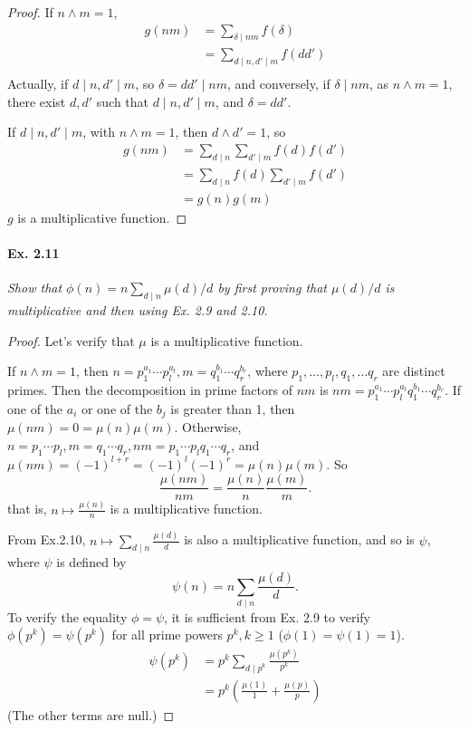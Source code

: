 \documentclass[11pt,a4paper]{article}
\begin{document}
{\begin{proof}
If $n \wedge m =1$,
\begin{align*}
g(nm)&= \sum_{\delta \mid nm} f(\delta)\\
&= \sum_{d\mid n, d'\mid m }f(dd')\\
\end{align*}
Actually, if $d\mid n, d'\mid m$, so $\delta = dd' \mid nm$, and conversely, if $\delta \mid nm$, as $n\wedge m = 1$, there exist $d,d'$ such that $d\mid n,d'\mid m$, and $\delta = dd'$.

If $d \mid n, d' \mid m$, with $n\wedge m = 1$, then $d \wedge d' = 1$, so
\begin{align*}
g(nm) &=\sum_{d\mid n } \sum_{d'\mid m} f(d) f(d')\\
&= \sum_{d\mid n}f(d) \sum_{d'\mid m} f(d')\\
&=g(n) g(m)
\end{align*}
$g$ is a multiplicative function.
\end{proof}

\paragraph{Ex. 2.11}

{\it Show that $\phi(n) = n \sum_{d\mid n}\mu(d)/d$ by first proving that $\mu(d)/d$ is multiplicative and then using Ex. 2.9 and 2.10.
}

\begin{proof}
Let's verify that $\mu$ is a multiplicative function.

If $n\wedge m = 1$, then $ n = p_1^{a_1}\cdots p_l^{a_l}, m= q_1^{b_1}\cdots q_r^{b_r}$, where $p_1,\ldots,p_l, q_1,\ldots q_r$ are distinct primes. Then the decomposition in prime factors of $nm$ is  $nm = p_1^{a_1}\cdots p_l^{a_l} q_1^{b_1}\cdots q_r^{b_r}$. If one of the $a_i$ or one of the $b_j$ is greater than 1, then $\mu(nm) = 0 = \mu(n)\mu(m)$. Otherwise, $n = p_1\cdots p_l, m = q_1\cdots q_r, nm = p_1\cdots p_l q_1\cdots q_r$, and $\mu(nm) = (-1)^{l+r} = (-1)^l(-1)^r = \mu(n)\mu(m)$. So
$$\frac{\mu(nm)}{nm} = \frac{\mu(n)}{n} \frac{\mu(m)}{m}.$$
that is, $n \mapsto \frac{\mu(n)}{n}$ is a multiplicative function.

From Ex.2.10, $n \mapsto \sum_{d\mid n} \frac{\mu(d)}{d}$ is also a multiplicative function, and so is $\psi$, where $\psi$ is defined by
$$\psi(n) = n \sum_{d\mid n} \frac{\mu(d)}{d}.$$
To verify the equality $\phi = \psi$, it is sufficient from Ex. 2.9 to verify $\phi(p^k) = \psi(p^k)$ for all prime powers $p^k, k\geq 1$ ($\phi(1) = \psi(1) = 1$).
\begin{align*}
\psi(p^k) &= p^k \sum_{d\mid p^k } \frac{\mu (p^k)}{p^k}\\
&=p^k \left(\frac{\mu(1)}{1}+\frac{\mu(p)}{p}\right)
\end{align*}
(The other terms are null.)


\end{proof}}
\end{document}

